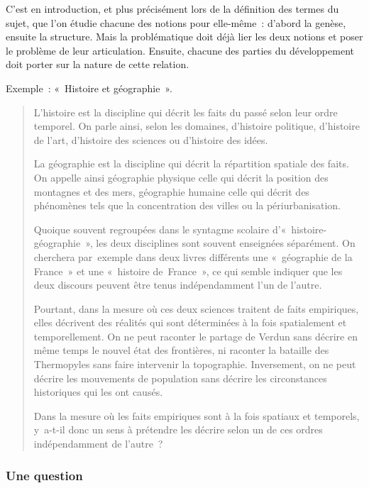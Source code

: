 \documentclass[a4paper,12pt]{article}
\begin{document}
C'est en introduction, et plus précisément lors de la définition des
termes du sujet, que l'on étudie chacune des notions pour elle-même :
d'abord la genèse, ensuite la structure. Mais la problématique doit déjà
lier les deux notions et poser le problème de leur articulation.
Ensuite, chacune des parties du développement doit porter sur la nature
de cette relation.

Exemple : « Histoire et géographie ».
\begin{quotation}
L'histoire est la discipline qui décrit les faits
du passé selon leur ordre temporel. On parle ainsi, selon les domaines,
d'histoire politique, d'histoire de l'art, d'histoire des sciences ou
d'histoire des idées.

La géographie est la discipline qui décrit la répartition spatiale des
faits. On appelle ainsi géographie physique celle qui décrit la position
des montagnes et des mers, géographie humaine celle qui décrit des
phénomènes tels que la concentration des villes ou la périurbanisation.

Quoique souvent regroupées dans le syntagme
scolaire d'« his\-toire-géographie », les deux disciplines sont souvent
enseignées séparément. On cherchera par exemple dans deux livres
différents une « géographie de la France » et une « histoire
de France », ce qui semble indiquer que les deux discours peuvent être
tenus indépendamment l'un de l'autre.

Pourtant, dans la mesure où ces deux sciences
traitent de faits empiriques, elles décrivent des réalités qui sont
déterminées à la fois spatialement et temporellement. On ne peut
raconter le partage de Verdun sans décrire en même temps le nouvel état
des frontières, ni raconter la bataille des Thermopyles sans faire
intervenir la topographie. Inversement, on ne peut décrire les
mouvements de population sans décrire les circonstances historiques qui
les ont causés.

Dans la mesure où les faits empiriques sont à
la fois spatiaux et temporels, y a-t-il donc un sens à prétendre les
décrire selon un de ces ordres indépendamment de l'autre ?
\end{quotation}

\subsubsection{Une question}
\label{sec:orgcc9ce8b}
\end{document}
